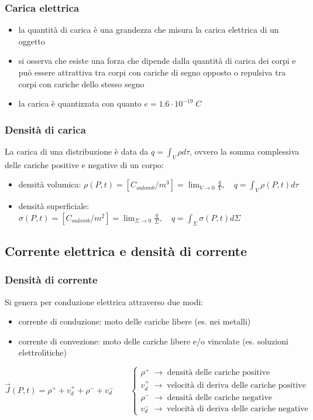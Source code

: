 \documentclass[a4paper]{article}
\begin{document}
\subsubsection*{Carica elettrica}
\begin{itemize}
	\item la quantità di carica è una grandezza che misura la carica elettrica di un oggetto
	\item si osserva che esiste una forza che dipende dalla quantità di carica dei corpi e può essere attrattiva tra corpi con
	cariche di segno opposto o repulsiva tra corpi con cariche dello stesso segno
	\item la carica è quantizzata con quanto \(e = 1.6 \cdot 10^{-19} \; C\)
\end{itemize}

\subsubsection*{Densità di carica}
La carica di una distribuzione è data da \(\displaystyle q = \int_V \rho d\tau\), ovvero la somma complessiva delle cariche positive
e negative di un corpo:
\begin{itemize}
	\item densità volumica: \(\displaystyle \rho(P,t) = [C_{oulomb}/m^3] = \lim_{V \to 0} \frac{q}{V}, \quad q = \int_V \rho(P,t) d\tau\)
	\item densità superficiale: \(\displaystyle \sigma(P,t) = [C_{oulomb}/m^2] = \lim_{\Sigma \to 0} \frac{q}{\Sigma}, \quad q = \int_\Sigma \sigma(P,t) d\Sigma\)
\end{itemize}

\subsection{Corrente elettrica e densità di corrente}
\subsubsection*{Densità di corrente}
Si genera per conduzione elettrica attraverso due modi:
\begin{itemize}
	\item corrente di conduzione: moto delle cariche libere (es. nei metalli)
	\item corrente di convezione: moto delle cariche libere e/o vincolate (es. soluzioni elettrolitiche)
\end{itemize}
\[\vec{J}(P,t) = \rho^+ + v_d^+ + \rho^- + v_d^-  \qquad \begin{cases}
	\rho^+ \;\rightarrow\; \text{densità delle cariche positive} \\
	v_d^+ \;\rightarrow\; \text{velocità di deriva delle cariche positive} \\
	\rho^- \;\rightarrow\; \text{densità delle cariche negative} \\
	v_d^- \;\rightarrow\; \text{velocità di deriva delle cariche negative}
\end{cases}\]
\end{document}
